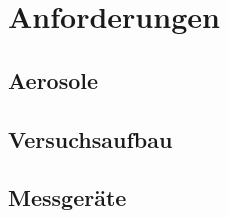 \section{Anforderungen}

\subsection{Aerosole}

\subsection{Versuchsaufbau}

\subsection{Messger\"{a}te}
